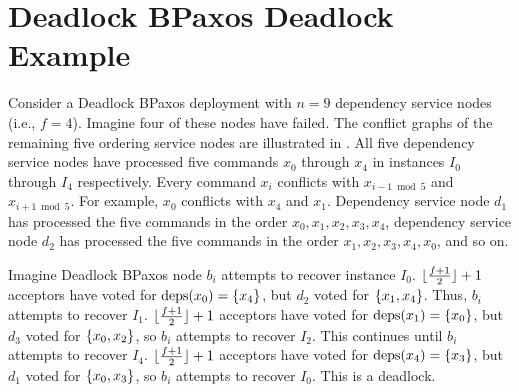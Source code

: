 \section{Deadlock BPaxos Deadlock Example}
Consider a Deadlock BPaxos deployment with $n = 9$ dependency service nodes
(i.e., $f = 4$). Imagine four of these nodes have failed. The conflict graphs
of the remaining five ordering service nodes are illustrated in
. All five dependency service nodes have
processed five commands $x_0$ through $x_4$ in instances $I_0$ through $I_4$
respectively. Every command $x_i$ conflicts with $x_{i - 1 \bmod 5}$ and $x_{i
+ 1 \bmod 5}$. For example, $x_0$ conflicts with $x_4$ and $x_1$. Dependency
service node $d_1$ has processed the five commands in the order $x_0, x_1, x_2,
x_3, x_4$, dependency service node $d_2$ has processed the five commands in the
order $x_1, x_2, x_3, x_4, x_0$, and so on.

{}

Imagine Deadlock BPaxos node $b_i$ attempts to recover instance $I_0$.
$\lfloor\frac{f + 1}{2}\rfloor + 1$ acceptors have voted for $\text{deps}(x_0) = \{x_4\}$, but
$d_2$ voted for $\{x_1, x_4\}$. Thus, $b_i$ attempts to recover $I_1$.
$\lfloor\frac{f + 1}{2}\rfloor + 1$ acceptors have voted for $\text{deps}(x_1) = \{x_0\}$, but
$d_3$ voted for $\{x_0, x_2\}$, so $b_i$ attempts to recover $I_2$. This
continues until $b_i$ attempts to recover $I_4$.  $\lfloor\frac{f + 1}{2}\rfloor + 1$
acceptors have voted for $\text{deps}(x_4) = \{x_3\}$, but $d_1$ voted for
$\{x_0, x_3\}$, so $b_i$ attempts to recover $I_0$. This is a deadlock.
